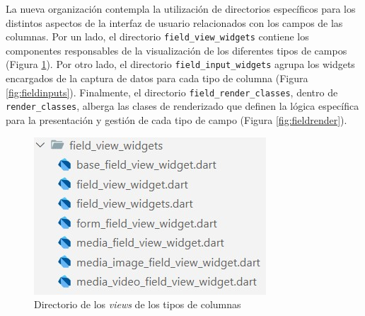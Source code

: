 \documentclass[12pt, a4paper]{book}
\begin{document}
La nueva organización contempla la utilización de directorios específicos para los distintos aspectos de la interfaz de usuario relacionados con los campos de las columnas. Por un lado, el directorio \texttt{field\_view\_widgets} contiene los componentes responsables de la visualización de los diferentes tipos de campos (Figura \ref{fig:fieldviews}). Por otro lado, el directorio \texttt{field\_input\_widgets} agrupa los widgets encargados de la captura de datos para cada tipo de columna (Figura \ref{fig:fieldinputs}). Finalmente, el directorio \texttt{field\_render\_classes}, dentro de \texttt{render\_classes}, alberga las clases de renderizado que definen la lógica específica para la presentación y gestión de cada tipo de campo (Figura \ref{fig:fieldrender}).

\begin{figure}[H]
  \centering
  \begin{minipage}[b]{0.3\textwidth}
    \centering
    \includegraphics[width=\textwidth]{images/field_views.jpg}
    \caption{Directorio de los \textit{views} de los tipos de columnas}
    \label{fig:fieldviews}
  \end{minipage}
  \hspace{0.02\textwidth}
  \begin{minipage}[b]{0.3\textwidth}
    \centering

\end{minipage}
\end{figure}
\end{document}
